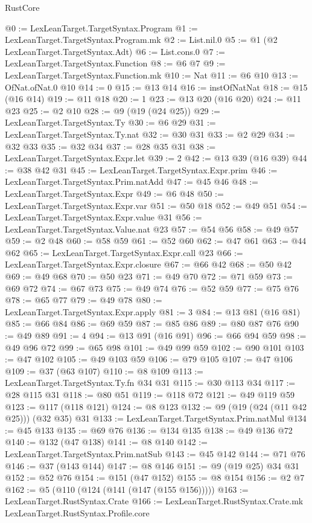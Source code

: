 \begin{lexlean}{RustCore}
\begin{coremodule}
@0 := LexLeanTarget.TargetSyntax.Program
@1 := LexLeanTarget.TargetSyntax.Program.mk
@2 := List.nil.{0}
@5 := @1 (@2 LexLeanTarget.TargetSyntax.Adt)
@6 := List.cons.{0}
@7 := LexLeanTarget.TargetSyntax.Function
@8 := @6 @7
@9 := LexLeanTarget.TargetSyntax.Function.mk
@10 := Nat
@11 := @6 @10
@13 := OfNat.ofNat.{0} @10
@14 := 0
@15 := @13 @14
@16 := instOfNatNat
@18 := @15 (@16 @14)
@19 := @11 @18
@20 := 1
@23 := @13 @20 (@16 @20)
@24 := @11 @23
@25 := @2 @10
@28 := @9 (@19 (@24 @25))
@29 := LexLeanTarget.TargetSyntax.Ty
@30 := @6 @29
@31 := LexLeanTarget.TargetSyntax.Ty.nat
@32 := @30 @31
@33 := @2 @29
@34 := @32 @33
@35 := @32 @34
@37 := @28 @35 @31
@38 := LexLeanTarget.TargetSyntax.Expr.let
@39 := 2
@42 := @13 @39 (@16 @39)
@44 := @38 @42 @31
@45 := LexLeanTarget.TargetSyntax.Expr.prim
@46 := LexLeanTarget.TargetSyntax.Prim.natAdd
@47 := @45 @46
@48 := LexLeanTarget.TargetSyntax.Expr
@49 := @6 @48
@50 := LexLeanTarget.TargetSyntax.Expr.var
@51 := @50 @18
@52 := @49 @51
@54 := LexLeanTarget.TargetSyntax.Expr.value @31
@56 := LexLeanTarget.TargetSyntax.Value.nat @23
@57 := @54 @56
@58 := @49 @57
@59 := @2 @48
@60 := @58 @59
@61 := @52 @60
@62 := @47 @61
@63 := @44 @62
@65 := LexLeanTarget.TargetSyntax.Expr.call @23
@66 := LexLeanTarget.TargetSyntax.Expr.closure
@67 := @66 @42
@68 := @50 @42
@69 := @49 @68
@70 := @50 @23
@71 := @49 @70
@72 := @71 @59
@73 := @69 @72
@74 := @67 @73
@75 := @49 @74
@76 := @52 @59
@77 := @75 @76
@78 := @65 @77
@79 := @49 @78
@80 := LexLeanTarget.TargetSyntax.Expr.apply
@81 := 3
@84 := @13 @81 (@16 @81)
@85 := @66 @84
@86 := @69 @59
@87 := @85 @86
@89 := @80 @87 @76
@90 := @49 @89
@91 := 4
@94 := @13 @91 (@16 @91)
@96 := @66 @94 @59
@98 := @49 @96 @72
@99 := @65 @98
@101 := @49 @99 @59
@102 := @90 @101
@103 := @47 @102
@105 := @49 @103 @59
@106 := @79 @105
@107 := @47 @106
@109 := @37 (@63 @107)
@110 := @8 @109
@113 := LexLeanTarget.TargetSyntax.Ty.fn @34 @31
@115 := @30 @113 @34
@117 := @28 @115 @31
@118 := @80 @51
@119 := @118 @72
@121 := @49 @119 @59
@123 := @117 (@118 @121)
@124 := @8 @123
@132 := @9 (@19 (@24 (@11 @42 @25))) (@32 @35) @31
@133 := LexLeanTarget.TargetSyntax.Prim.natMul
@134 := @45 @133
@135 := @69 @76
@136 := @134 @135
@138 := @49 @136 @72
@140 := @132 (@47 @138)
@141 := @8 @140
@142 := LexLeanTarget.TargetSyntax.Prim.natSub
@143 := @45 @142
@144 := @71 @76
@146 := @37 (@143 @144)
@147 := @8 @146
@151 := @9 (@19 @25) @34 @31
@152 := @52 @76
@154 := @151 (@47 @152)
@155 := @8 @154
@156 := @2 @7
@162 := @5 (@110 (@124 (@141 (@147 (@155 @156)))))
@163 := LexLeanTarget.RustSyntax.Crate
@166 := LexLeanTarget.RustSyntax.Crate.mk LexLeanTarget.RustSyntax.Profile.core

\end{coremodule}
\end{lexlean}

